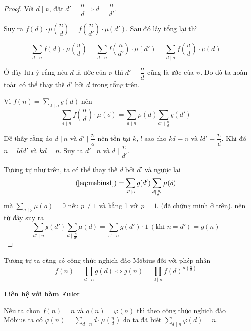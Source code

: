 \begin{proof}
    Với $d \mid n$, đặt $d' = \dfrac{n}{d} \Rightarrow d = \dfrac{n}{d'}$.

    Suy ra $f(d) \cdot \mu\left(\dfrac{n}{d}\right) = 
    f \left(\dfrac{n}{d'}\right) \cdot \mu(d')$.
    Sau đó lấy tổng lại thì

    \[\sum_{d \mid n} f(d) \cdot \mu \left(\frac{n}{d}\right) = 
    \sum_{d \mid n} f\left(\frac{n}{d'}\right) \cdot  \mu(d') = 
    \sum_{d \mid n} f\left(\frac{n}{d}\right) \cdot \mu(d)\]
    
    Ở đây lưu ý rằng nếu $d$ là ước của $n$ thì $d' = \dfrac{n}{d}$ cũng là
    ước của $n$. Do đó ta hoàn toàn có thể thay thế $d'$ bởi $d$ trong tổng trên.

    Vì $f(n) = \displaystyle{\sum_{d \mid n} g(d)}$ nên 
    \begin{equation}
        \label{eq:mebius1}
        \sum_{d \mid n} f\left(\frac{n}{d}\right) \cdot \mu(d)
    = \sum_{d \mid n} \mu(d) \sum_{d' \mid \frac{n}{d}} g(d')
    \end{equation}

    Dễ thấy rằng do $d \mid n$ và $d' \mid \dfrac{n}{d}$ nên tồn tại
    $k$, $l$ sao cho $kd = n$ và $ld' = \dfrac{n}{d}$. Khi đó $n = ldd'$ và $kd = n$.
    Suy ra $d' \mid n$ và $d \mid \dfrac{n}{d'}$.

    Tương tự như trên, ta có thể thay thế $d$ bởi $d'$ và ngược lại
    \[(\ref{eq:mebius1}) = \sum_{d' \mid n} g(d') \sum_{d \mid \frac{n}{d'}} \mu(d)\]
    mà $\displaystyle{\sum_{a \mid p} \mu(a) = 0}$ nếu $p \neq 1$ và bằng 1 với $p = 1$.
    (đã chứng minh ở trên), nên từ đây suy ra
    \[
        \sum_{d' \mid n} g(d') \sum_{d \mid \frac{n}{d'}} \mu(d)
        = \sum_{d' \mid n} g(d') \cdot 1 \,(\text{khi } n = d') = g(n)    
    \]
\end{proof}

Tương tự ta cũng có công thức nghịch đảo Möbius đối với phép nhân
\begin{equation}
    f(n) = \prod_{d \mid n} g(d) \Leftrightarrow 
    g(n) = \prod_{d \mid n} f(d)^{\mu\left(\frac{n}{d}\right)}
\end{equation}

\textbf{Liên hệ với hàm Euler}

Nếu ta chọn $f(n) = n$ và $g(n) = \varphi(n)$ thì theo công thức nghịch đảo Möbius ta có
$\displaystyle{\varphi(n) = \sum_{d \mid n} d \cdot \mu\left(\frac{n}{d}\right)}$
do ta đã biết $\displaystyle{\sum_{d \mid n} \varphi(d) = n}$.

